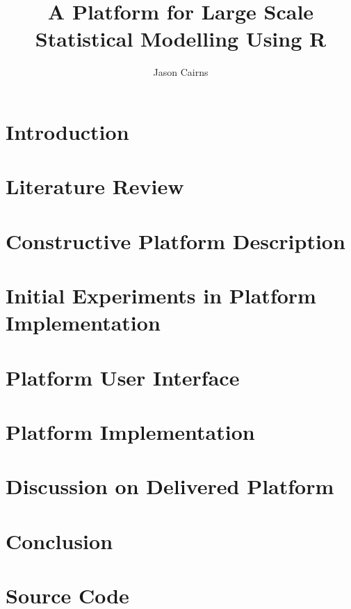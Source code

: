\documentclass[11pt,a4paper,partial,examcopy]{aucklandthesis} %
\title{A Platform for Large Scale Statistical Modelling Using R}
\author{Jason Cairns}
\begin{document}


\chapter{Introduction}


\chapter{Literature Review}


\chapter{Constructive Platform Description}


\chapter{Initial Experiments in Platform Implementation}


\chapter{Platform User Interface}\label{sec:ui}


\chapter{Platform Implementation}


\chapter{Discussion on Delivered Platform}
\chapter{Conclusion}

\appendix
\chapter{Source Code}

\printbibliography
\end{document}
